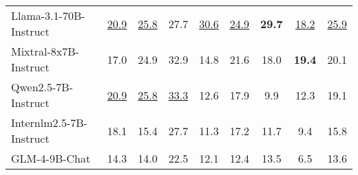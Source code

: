 \begin{table*}[!t]
{\begin{tabular}{l|ccccccc|c}
\multicolumn{1}{l|}{Llama-3.1-70B-Instruct} & \underline{20.9}\hspace{3.5mm} & \underline{25.8}\hspace{3.5mm} & 27.7\hspace{3.5mm} & \underline{30.6}\hspace{3.5mm} & \underline{24.9}\hspace{3.5mm} & \textbf{29.7}\hspace{3.5mm} & \underline{18.2}\hspace{3.5mm} & \underline{25.9} \\
\multicolumn{1}{l|}{Mixtral-8x7B-Instruct} & 17.0\hspace{3.5mm} & 24.9\hspace{3.5mm} & 32.9\hspace{3.5mm} & 14.8\hspace{3.5mm} & 21.6\hspace{3.5mm} & 18.0\hspace{3.5mm} & \textbf{19.4}\hspace{3.5mm} & 20.1 \\
\multicolumn{1}{l|}{Qwen2.5-7B-Instruct} & \underline{20.9}\hspace{3.5mm} & \underline{25.8}\hspace{3.5mm} & \underline{33.3}\hspace{3.5mm} & 12.6\hspace{3.5mm} & 17.9\hspace{3.5mm} & 9.9\hspace{3.5mm} & 12.3\hspace{3.5mm} & 19.1 \\
\multicolumn{1}{l|}{Internlm2.5-7B-Instruct} & 18.1\hspace{3.5mm} & 15.4\hspace{3.5mm} & 27.7\hspace{3.5mm} & 11.3\hspace{3.5mm} & 17.2\hspace{3.5mm} & 11.7\hspace{3.5mm} & 9.4\hspace{3.5mm} & 15.8 \\ 
\multicolumn{1}{l|}{GLM-4-9B-Chat} & 14.3\hspace{3.5mm} & 14.0\hspace{3.5mm} & 22.5\hspace{3.5mm} & 12.1\hspace{3.5mm} & 12.4\hspace{3.5mm} & 13.5\hspace{3.5mm} & 6.5\hspace{3.5mm} & 13.6 \\

\end{tabular}}
\end{table*}

